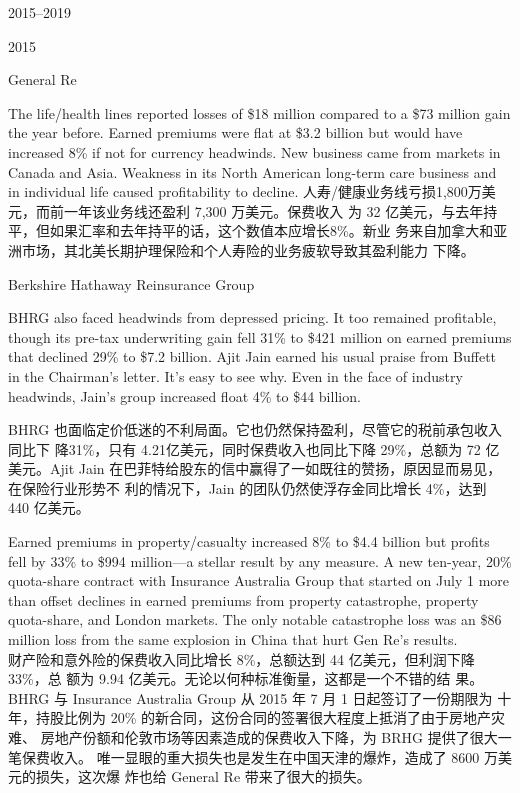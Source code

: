 \begin{chapter}{2015--2019}
\begin{section}{2015}
\begin{subsection}{General Re}
\begin{verseparallel}
  {
    The life/health lines reported losses of \$18 million compared to a \$73
    million gain the year before. Earned premiums were flat at \$3.2 billion but
    would have increased 8\% if not for currency headwinds. New business came
    from markets in Canada and Asia. Weakness in its North American long-term
    care business and in individual life caused profitability to decline.
  }
  {
    人寿/健康业务线亏损1,800万美元，而前一年该业务线还盈利 7,300 万美元。保费收入
    为 32 亿美元，与去年持平，但如果汇率和去年持平的话，这个数值本应增长8\%。新业
    务来自加拿大和亚洲市场，其北美长期护理保险和个人寿险的业务疲软导致其盈利能力
    下降。
  }
\end{verseparallel}
\end{subsection}


\begin{subsection}{Berkshire Hathaway Reinsurance Group}
\begin{verseparallel}
  {

    BHRG also faced headwinds from depressed pricing. It too remained
    profitable, though its pre-tax underwriting gain fell 31\% to \$421 million on
    earned premiums that declined 29\% to \$7.2 billion. Ajit Jain earned his
    usual praise from Buffett in the Chairman's letter. It's easy to see why.
    Even in the face of industry headwinds, Jain's group increased float
    4\% to \$44 billion. \\
  }
  {
    BHRG 也面临定价低迷的不利局面。它也仍然保持盈利，尽管它的税前承包收入同比下
    降31\%，只有 4.21亿美元，同时保费收入也同比下降 29\%，总额为 72 亿美元。Ajit
    Jain 在巴菲特给股东的信中赢得了一如既往的赞扬，原因显而易见，在保险行业形势不
    利的情况下，Jain 的团队仍然使浮存金同比增长 4\%，达到 440 亿美元。
  }
\end{verseparallel}

\begin{verseparallel}
  {
    Earned premiums in property/casualty increased 8\% to \$4.4 billion but
    profits fell by 33\% to \$994 million—a stellar result by any measure. A new
    ten-year, 20\% quota-share contract with Insurance Australia Group that
    started on July 1 more than offset declines in earned premiums from property
    catastrophe, property quota-share, and London markets. The only notable
    catastrophe loss was an \$86 million loss from the same explosion in China
    that hurt Gen Re's results. \\
  }
  {
    财产险和意外险的保费收入同比增长 8\%，总额达到 44 亿美元，但利润下降 33\%，总
    额为 9.94 亿美元。无论以何种标准衡量，这都是一个不错的结
    果。BHRG 与 Insurance Australia Group 从 2015 年 7 月 1 日起签订了一份期限为
    十年，持股比例为 20\% 的新合同，这份合同的签署很大程度上抵消了由于房地产灾难、
    房地产份额和伦敦市场等因素造成的保费收入下降，为 BRHG 提供了很大一笔保费收入。
    唯一显眼的重大损失也是发生在中国天津的爆炸，造成了 8600 万美元的损失，这次爆
    炸也给 General Re 带来了很大的损失。
  }
\end{verseparallel}


\end{subsection}
\end{section}
\end{chapter}
